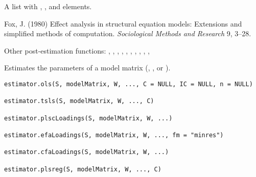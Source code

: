 \documentclass[a4paper]{book}
\begin{document}
%
\begin{Value}
A list with , , and  elements.
\end{Value}
%
\begin{References}\relax
Fox, J. (1980) Effect analysis in structural equation models: Extensions and simplified methods of computation. \emph{Sociological Methods and Research}
9, 3--28.
\end{References}
%
\begin{SeeAlso}\relax
Other post-estimation functions: 
,
,
,
,
,
,
,
,
,
,
\end{SeeAlso}
%
\begin{Description}\relax
Estimates the parameters of a model matrix (,
, or ).
\end{Description}
%
\begin{Usage}
\begin{verbatim}
estimator.ols(S, modelMatrix, W, ..., C = NULL, IC = NULL, n = NULL)

estimator.tsls(S, modelMatrix, W, ..., C)

estimator.plscLoadings(S, modelMatrix, W, ...)

estimator.efaLoadings(S, modelMatrix, W, ..., fm = "minres")

estimator.cfaLoadings(S, modelMatrix, W, ...)

estimator.plsreg(S, modelMatrix, W, ..., C)
\end{verbatim}
\end{Usage}
%
\end{document}
